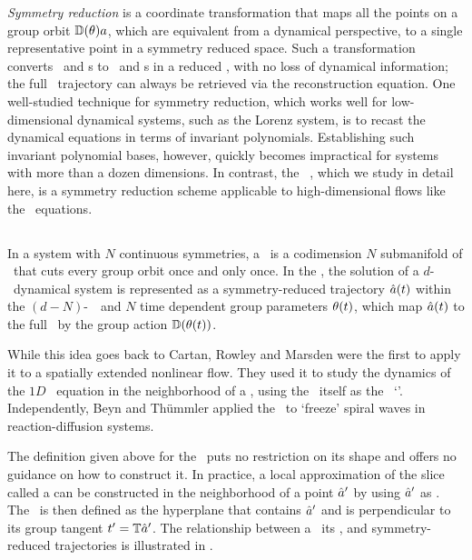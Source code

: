 \emph{Symmetry reduction} is a coordinate transformation that maps
all the points on a group orbit $\mathbb{D}(\theta) a$, which are
equivalent from a dynamical perspective, to a single representative point in a symmetry reduced space.
Such a transformation converts \reqva\ and \rpo s to \eqva\ and \po s in a
reduced \statesp, with no loss of dynamical information; the full \statesp\
trajectory can always be retrieved via the reconstruction equation. One well-studied
technique for symmetry reduction, which works well for low-dimensional
dynamical systems, such as the Lorenz system,
is to recast the dynamical equations in terms of invariant polynomials.
Establishing such invariant polynomial bases, however, quickly becomes
impractical for systems with more than a dozen dimensions. In contrast,
the \mslices\ ,
which we study in detail here, is a symmetry reduction scheme applicable to
high-dimensional flows like the \NS\ equations\rf{WiShCv14}.

\subsection{\Mslices}
\label{s-slice}

In a system with $N$ continuous symmetries, a \emph{\slice} \pSRed\ is a codimension $N$ submanifold
of \pS\ that cuts every group orbit once and only once. In the \emph{\mslices}, the solution
of a $d$-\dmn\ dynamical system is represented as a symmetry-reduced trajectory $\hat{a} (t)$ within the
$(d-N)$-\dmn\ \slice\ and $N$ time dependent group parameters $\theta(t)$, which
map $\hat{a} (t)$ to the full \statesp\ by the group action $\mathbb{D}(\theta(t))$.

While this idea goes back to Cartan,
Rowley and Marsden
were the first to apply it to a spatially extended nonlinear flow. They used it to study the dynamics of
the $1D$ \KS\ equation in the neighborhood of
a \reqv, using the \reqv\ itself as the \slice\ `\template'.
Independently, Beyn and Th\"{u}mmler applied
the \mslices\ to `freeze' spiral waves in reaction-diffusion systems.

The definition given above for the \slice\ puts no restriction on its shape
and offers no guidance on how to construct it. In practice, a
local approximation of the slice called a \emph{\slicePlane} can be constructed
in the neighborhood of a point ${\hat{a}'}$ by using ${\hat{a}'}$ as
\emph{\template}. The \slicePlane\ is then defined as the hyperplane that
contains ${\hat{a}'}$ and is perpendicular to its group tangent $t'_{}
= \mathbb{T} {\hat{a}'}$. The relationship between a \template\, its \slicePlane, and symmetry-reduced trajectories
is illustrated in \reffig{f-ReducTraj1}.

